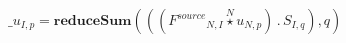 \documentclass[border=2pt]{standalone}
\begin{document}
${\_u}{_{I, p}}=\textbf{reduceSum}\left(\left(\left({{F^{source}}}{_{N, I}} \stackrel{N}{\star} {u}{_{N, p}}\right) \, . \, {{S}}{_{I, q}}\right),q\right)$
\end{document}
